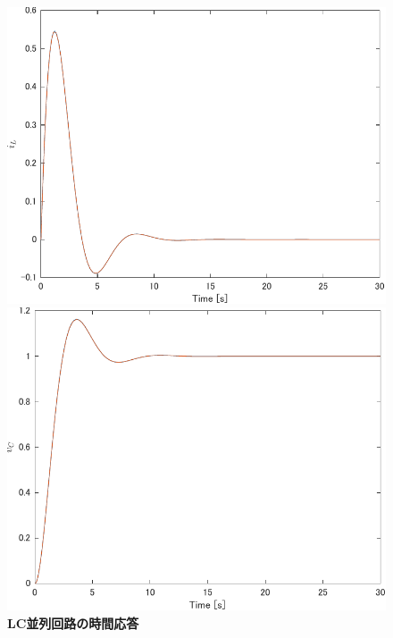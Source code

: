 \documentclass[tombow,dvipdfmx]{corona-a5-1.1}
\begin{document}
\begin{例}[簡単な微分代数方程式系の数値解法]
\begin{figure}[t]
  \centering
  {
    \begin{minipage}{0.49\linewidth}
      \centering
      \includegraphics[width = 1.0\linewidth]{figs/i_L}
    \end{minipage}
    \begin{minipage}{0.49\linewidth}
      \centering
      \includegraphics[width = 1.0\linewidth]{figs/v_C}
    \end{minipage}
    \medskip
    \caption{\textbf{LC並列回路の時間応答}
    }
    \label{fig:solution_dae}
  }
  \medskip
\end{figure}
\end{例}
\end{document}

